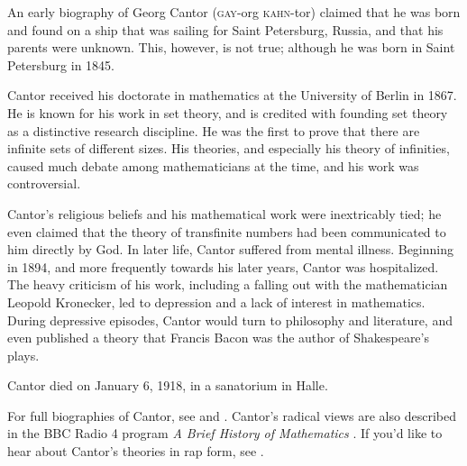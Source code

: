 \documentclass[../../../include/open-logic-section]{subfiles}
\begin{document}


An early biography of Georg Cantor (\textsc{gay}-org
\textsc{kahn}-tor) claimed that he was born and found on a ship that
was sailing for Saint Petersburg, Russia, and that his parents were
unknown. This, however, is not true; although he was born in Saint
Petersburg in 1845.

Cantor received his doctorate in mathematics at the University of Berlin in
1867. He is known for his work in set theory, and is credited with founding
set theory as a distinctive research discipline.
He was the first to prove that there are infinite sets of different sizes.
His theories, and especially his theory of infinities, caused much debate
among mathematicians at the time, and his work was controversial.

Cantor's religious beliefs and his mathematical work were inextricably
tied; he even claimed that the theory of transfinite numbers had been
communicated to him directly by God. In later life, Cantor suffered
from mental illness. Beginning in 1894, and more frequently towards
his later years, Cantor was hospitalized.  The heavy criticism of his
work, including a falling out with the mathematician Leopold
Kronecker, led to depression and a lack of interest in
mathematics. During depressive episodes, Cantor would turn to
philosophy and literature, and even published a theory that Francis Bacon
was the author of Shakespeare's plays.

Cantor died on January 6, 1918, in a sanatorium in Halle.

\begin{reading} 
For full biographies of Cantor, see \cite{Dauben1990} and
\cite{Grattan-Guinness1971}.  Cantor's radical views are also
described in the BBC Radio 4 program \emph{A Brief History of
  Mathematics} \cite{Sautoy2014}.  If you'd like to hear about
Cantor's theories in rap form, see \cite{Rose2012}.
\end{reading}
\end{document}
